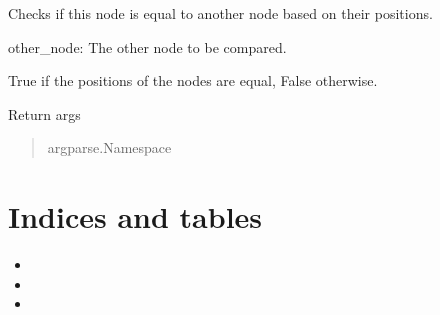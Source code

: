 \documentclass[letterpaper,10pt,english]{sphinxmanual}
\begin{document}
\begin{fulllineitems}
\label{\detokenize{main:main.equals}}
\pysigstartsignatures
{}
\pysigstopsignatures
\sphinxAtStartPar
Checks if this node is equal to another node based on their positions.
\begin{description}
\sphinxAtStartPar
other\_node: The other node to be compared.

\sphinxAtStartPar
True if the positions of the nodes are equal, False otherwise.

\end{description}

\end{fulllineitems}


\begin{fulllineitems}
\label{\detokenize{main:main.get_args}}
\pysigstartsignatures
{}
\pysigstopsignatures
\sphinxAtStartPar
Return args
\begin{quote}\begin{description}
\sphinxAtStartPar
argparse.Namespace

\end{description}\end{quote}

\end{fulllineitems}


\begin{fulllineitems}
\label{\detokenize{main:main.main}}
\pysigstartsignatures
{}
\pysigstopsignatures
\end{fulllineitems}



\chapter{Indices and tables}
\label{\detokenize{index:indices-and-tables}}\begin{itemize}
\item {} 
\sphinxAtStartPar
{}

\item {} 
\sphinxAtStartPar
{}

\item {} 
\sphinxAtStartPar
{}

\end{itemize}


\renewcommand{\indexname}{Python Module Index}
\begin{sphinxtheindex}
\let\bigletter\sphinxstyleindexlettergroup
\bigletter{m}
\item\relax{}
\end{sphinxtheindex}

\renewcommand{\indexname}{Index}
\printindex
\end{document}
